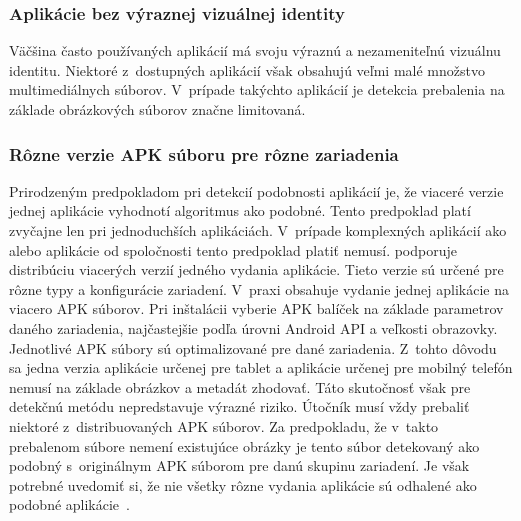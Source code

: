 \subsubsection{\textbf{Aplikácie bez výraznej vizuálnej identity}}
Väčšina často používaných aplikácií má svoju výraznú a nezameniteľnú vizuálnu identitu. Niektoré z~dostupných aplikácií však obsahujú veľmi malé množstvo multimediálnych súborov. V~prípade takýchto aplikácií je detekcia prebalenia na základe obrázkových súborov značne limitovaná.

\subsubsection{\textbf{Rôzne verzie APK súboru pre rôzne zariadenia}}
Prirodzeným predpokladom pri detekcií podobnosti aplikácií je, že viaceré verzie jednej aplikácie vyhodnotí algoritmus ako podobné. Tento predpoklad platí zvyčajne len pri jednoduchších aplikáciách. V~prípade komplexných aplikácií ako  alebo  aplikácie od spoločnosti  tento predpoklad platiť nemusí.  podporuje distribúciu viacerých verzií jedného vydania aplikácie. Tieto verzie sú určené pre rôzne typy a konfigurácie zariadení. V~praxi obsahuje vydanie jednej aplikácie na  viacero APK súborov. Pri inštalácii vyberie  APK balíček na základe parametrov daného zariadenia, najčastejšie podľa úrovni Android API a veľkosti obrazovky. Jednotlivé APK súbory sú optimalizované pre dané zariadenia. Z~tohto dôvodu sa jedna verzia aplikácie určenej pre tablet a aplikácie určenej pre mobilný telefón nemusí na základe obrázkov a metadát zhodovať. 
Táto skutočnosť však pre detekčnú metódu nepredstavuje výrazné riziko. Útočník musí vždy prebaliť niektoré z~distribuovaných APK súborov. Za predpokladu, že v~takto prebalenom súbore nemení existujúce obrázky je tento súbor detekovaný ako podobný s~originálnym APK súborom pre danú skupinu zariadení. Je však potrebné uvedomiť si, že nie všetky rôzne vydania aplikácie sú odhalené ako podobné aplikácie~\cite{MultipleApks}.

